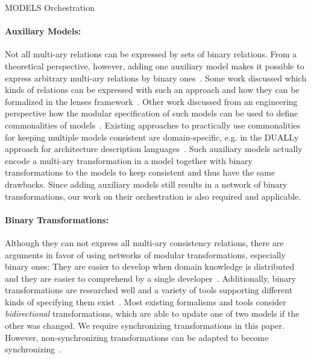 \begin{copiedFrom}{MODELS Orchestration}
\paragraph{Auxiliary Models:}
Not all multi-ary relations can be expressed by sets of binary relations.
From a theoretical perspective, however, adding one auxiliary model makes it possible to express arbitrary multi-ary relations by binary ones~\cite{stevens2020BidirectionalTransformationLarge-SoSym}.
Some work discussed which kinds of relations can be expressed with such an approach and how they can be formalized in the lenses framework~\cite{stunkel2018MultimodelCorrespondence-ICPS, diskin2018MultiModelSynchronization-FASE}.
Other work discussed from an engineering perspective how the modular specification %
of such models can be used to define commonalities of models~\cite{klare2019models}.
Existing approaches to practically use commonalities for keeping multiple models consistent are domain-specific, e.g. in the DUALLy approach for architecture description languages~\cite{malavolta2010ADLInteroperability-TSE, eramo2012Dually-SoSym}.
Such auxiliary models actually encode a multi-ary transformation in a model together with binary transformations to the models to keep consistent and thus have the same drawbacks.
Since adding auxiliary models still results in a network of binary transformations, our work on their orchestration is also required and applicable.

\paragraph{Binary Transformations:}
Although they can not express all multi-ary consistency relations, there are arguments in favor of using networks of modular transformations, especially binary ones:
They are easier to develop when domain knowledge is distributed~\cite{klare2018docsym} and they are easier to comprehend by a single developer~\cite{cleve2019dagstuhl, stevens2020BidirectionalTransformationLarge-SoSym}.
Additionally, binary transformations are researched well and a variety of tools supporting different kinds of specifying them exist~\cite{stevens2008LandscapeBidirectionalTransformation-GTTSE, etzlstorfer2013SurveyIncrementalTransformation-ME, samimi-dehkordi2016iccke, macedo2017ModelRepairClassification-TSE}.
Most existing formalisms and tools consider \emph{bidirectional} transformations, which are able to update one of two models if the other was changed.
We require synchronizing transformations in this paper.
However, non-synchronizing transformations can be adapted to become synchronizing~\cite{xiong2013SynchronizingConcurrentUpdates-SoSym}.


\end{copiedFrom}
